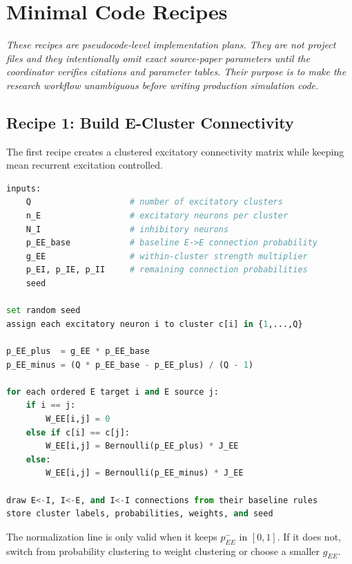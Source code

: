\chapter{Minimal Code Recipes}
\label{app:minimal-code-recipes}

\textit{These recipes are pseudocode-level implementation plans. They are not project files and they intentionally omit exact source-paper parameters until the coordinator verifies citations and parameter tables. Their purpose is to make the research workflow unambiguous before writing production simulation code.}

\section{Recipe 1: Build E-Cluster Connectivity}
\label{app:recipe-build-e-cluster-connectivity}

The first recipe creates a clustered excitatory connectivity matrix while keeping mean recurrent excitation controlled.

\begin{lstlisting}[language=Python,caption={Pseudocode for E-cluster connectivity.}]
inputs:
    Q                    # number of excitatory clusters
    n_E                  # excitatory neurons per cluster
    N_I                  # inhibitory neurons
    p_EE_base            # baseline E->E connection probability
    g_EE                 # within-cluster strength multiplier
    p_EI, p_IE, p_II     # remaining connection probabilities
    seed

set random seed
assign each excitatory neuron i to cluster c[i] in {1,...,Q}

p_EE_plus  = g_EE * p_EE_base
p_EE_minus = (Q * p_EE_base - p_EE_plus) / (Q - 1)

for each ordered E target i and E source j:
    if i == j:
        W_EE[i,j] = 0
    else if c[i] == c[j]:
        W_EE[i,j] = Bernoulli(p_EE_plus) * J_EE
    else:
        W_EE[i,j] = Bernoulli(p_EE_minus) * J_EE

draw E<-I, I<-E, and I<-I connections from their baseline rules
store cluster labels, probabilities, weights, and seed
\end{lstlisting}

The normalization line is only valid when it keeps $p_{EE}^{-}$ in $[0,1]$. If it does not, switch from probability clustering to weight clustering or choose a smaller $g_{EE}$.

